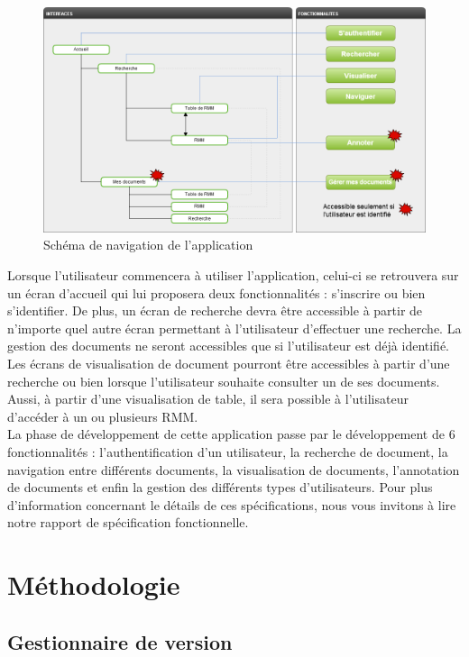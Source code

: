 \documentclass[a4paper]{article}
\begin{document}
\begin{figure}[H]
\centering
\includegraphics[width=\textwidth]{navigation.png}
\caption{Schéma de navigation de l'application}
\label{fig:navigation}
\end{figure}

	Lorsque l’utilisateur commencera à utiliser l’application, celui-ci se retrouvera sur un écran d’accueil qui lui proposera deux fonctionnalités : s'inscrire ou bien s’identifier. De plus, un écran de recherche devra être accessible à partir de n’importe quel autre écran permettant à l'utilisateur d'effectuer une recherche. La gestion des documents ne seront accessibles que si l’utilisateur est déjà identifié. Les écrans de visualisation de document pourront être accessibles à partir d’une recherche ou bien lorsque l’utilisateur souhaite consulter un de ses documents. Aussi, à partir d’une visualisation de table, il sera possible à l’utilisateur d’accéder à un ou plusieurs RMM.\\
	
	La phase de développement de cette application passe par le développement de 6 fonctionnalités : l'authentification d'un utilisateur, la recherche de document, la navigation entre différents documents, la visualisation de documents, l'annotation de documents et enfin la gestion des différents types d'utilisateurs. Pour plus d'information concernant le détails de ces spécifications, nous vous invitons à lire notre rapport de spécification fonctionnelle.\\
	
\section{Méthodologie}

	\subsection{Gestionnaire de version}
\end{document}
